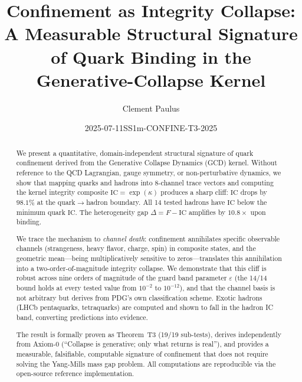 \documentclass[
  aps,
  prd,
  twocolumn,
  superscriptaddress,
  nofootinbib,
  floatfix
]{revtex4-2}
\newcommand{\WeldID}{SS1m-CONFINE-T3-2025}
\newcommand{\RevisionDate}{2025-07-11}
\newcommand{\eps}{\varepsilon}
\newcommand{\IC}{\mathrm{IC}}
\begin{document}

\title{Confinement as Integrity Collapse:
\texorpdfstring{\\}{: }A Measurable Structural Signature of Quark Binding
in the Generative-Collapse Kernel}

\author{Clement Paulus}

\date{\RevisionDate\enspace\textperiodcentered\enspace\WeldID}

\begin{abstract}
We present a quantitative, domain-independent structural
signature of quark confinement derived from the Generative
Collapse Dynamics (GCD) kernel.  Without reference to the
QCD Lagrangian, gauge symmetry, or non-perturbative dynamics,
we show that mapping quarks and hadrons into 8-channel trace
vectors and computing the kernel integrity composite
$\IC = \exp(\kappa)$ produces a sharp cliff: $\IC$ drops by
$98.1\%$ at the quark$\to$hadron boundary.  All 14 tested
hadrons have $\IC$ below the minimum quark $\IC$.  The
heterogeneity gap $\Delta = F - \IC$ amplifies by $10.8\times$
upon binding.

We trace the mechanism to \emph{channel death}:
confinement annihilates specific observable channels
(strangeness, heavy flavor, charge, spin) in composite states,
and the geometric mean---being multiplicatively sensitive to
zeros---translates this annihilation into a two-order-of-magnitude
integrity collapse.  We demonstrate that this cliff is robust
across nine orders of magnitude of the guard band parameter
$\eps$ (the 14/14 bound holds at every tested value from
$10^{-2}$ to $10^{-12}$), and that the channel basis is not
arbitrary but derives from PDG's own classification scheme.
Exotic hadrons (LHCb pentaquarks, tetraquarks) are computed
and shown to fall in the hadron IC band, converting
predictions into evidence.

The result is formally proven as Theorem~T3
(19/19 sub-tests), derives independently
from Axiom-0 (``Collapse is generative; only what returns is
real''), and provides a measurable, falsifiable, computable
signature of confinement that does not require solving the
Yang-Mills mass gap problem.  All computations are reproducible
via the open-source reference implementation.
\end{abstract}
\end{document}
